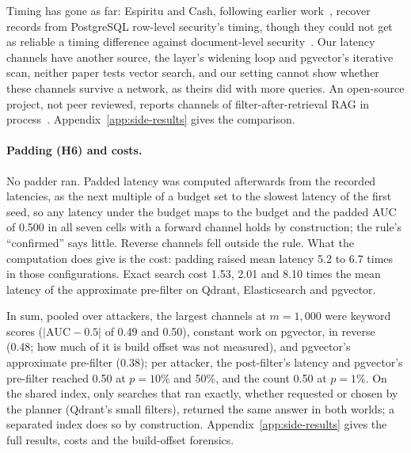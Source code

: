 Timing has gone as far: Espiritu and Cash, following earlier work~\cite{dar2023rls,rasin2024vulnerability}, recover records from PostgreSQL row-level security's timing, though they could not get as reliable a timing difference against document-level security~\cite{espiritu2026plaintext}. Our latency channels have another source, the layer's widening loop and pgvector's iterative scan, neither paper tests vector search, and our setting cannot show whether these channels survive a network, as theirs did with more queries. An open-source project, not peer reviewed, reports channels of filter-after-retrieval RAG in process~\cite{raghuram2026onewayglass}. Appendix~\ref{app:side-results} gives the comparison.

\paragraph{Padding (H6) and costs.}
No padder ran. Padded latency was computed afterwards from the recorded latencies, as the next multiple of a budget set to the slowest latency of the first seed, so any latency under the budget maps to the budget and the padded AUC of 0.500 in all seven cells with a forward channel holds by construction; the rule's ``confirmed'' says little. Reverse channels fell
outside the rule. What the computation does give is the cost: padding raised mean latency 5.2 to 6.7 times in those configurations. Exact search cost 1.53, 2.01 and 8.10 times the
mean latency of the approximate pre-filter on Qdrant, Elasticsearch and pgvector.

In sum, pooled over attackers, the largest channels at $m = 1{,}000$ were keyword scores ($|\mathrm{AUC} - 0.5|$ of 0.49 and 0.50), constant work on pgvector, in reverse (0.48; how much of it is build offset was not measured), and
pgvector's approximate pre-filter (0.38); per attacker, the post-filter's latency and pgvector's pre-filter reached 0.50 at $p = 10\%$ and 50\%, and the count 0.50 at $p = 1\%$. On the shared index, only searches that ran exactly, whether requested or chosen by the planner (Qdrant's small filters), returned the same answer in both worlds; a separated index does so by construction. Appendix~\ref{app:side-results} gives the full
results, costs and the build-offset forensics.
